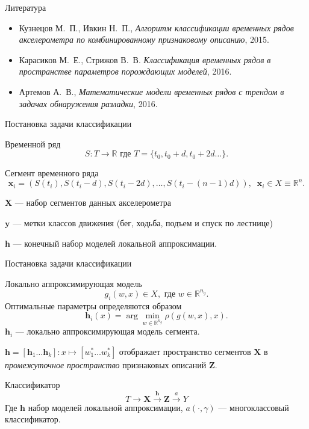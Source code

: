 \documentclass{beamer}
\newcommand{\bx}{\mathbf{x}}
\newcommand{\by}{\mathbf{y}}
\newcommand{\bX}{\mathbf{X}}
\newcommand{\bh}{\mathbf{h}}
\newcommand{\bZ}{\mathbf{Z}}
\newcommand{\R}{\mathbb{R}}
\begin{document}
\begin{frame}{Литература}
\begin{itemize}
    \item Кузнецов М.~П., Ивкин Н.~П., \textit{Алгоритм классификации временных рядов акселерометра по комбинированному признаковому описанию}, 2015.
    \item Карасиков М.~Е., Стрижов В.~В. \textit{Классификация временных рядов в пространстве параметров порождающих моделей}, 2016.
    \item Артемов А.~В., \textit{Математические модели временных рядов с трендом в задачах обнаружения разладки}, 2016.
\end{itemize}
\end{frame}




\begin{frame}{Постановка задачи классификации}
    \begin{block}{Временной ряд}
    $$
    S: T \to \R \text{ где } T = \{t_0, t_0 + d, t_0 + 2d \ldots\}.
    $$
    \end{block}
    \begin{block}{Сегмент временного ряда}%
    $$
    \bx_i  = (S(t_i), S(t_i - d), S(t_i - 2d), \ldots, S(t_i - (n - 1)d)),
\;\; \bx_i \in X \equiv \R^n.
    $$
    \end{block}
        $\bX$ — набор сегментов данных акселерометра

        $\by$ — метки классов движения (бег, ходьба, подъем и спуск по лестнице)

        $\bh$ — конечный набор моделей локальной аппроксимации.

\end{frame}



\begin{frame}{Постановка задачи классификации}
    \begin{block}{Локально аппроксимирующая модель}
        $$
        g_i(w, x) \in X, \text{ где }w \in \R^{n_g}.
        $$
        Оптимальные параметры определяются образом
        $$
        \bh_i(x) = \arg\min_{w \in \R^{n_g}} \rho(g(w, x), x).
        $$
        $\bh_i$ — локально аппроксимирующая модель сегмента.
    \end{block}

    $\bh = [\bh_1\ldots \bh_k]: x \mapsto [w_1^* \ldots w_k^*]$
    отображает пространство сегментов $\bX$ в
    \textit{промежуточное пространство} признаковых описаний $\bZ$.
    \begin{block}{Классификатор}
        $$
        T \rightarrow \bX \xrightarrow{\bh} \bZ \xrightarrow{a} Y
        $$
        Где $\bh$ набор моделей локальной аппроксимации, $a(\cdot, \gamma)$ —
        многоклассовый классификатор.
    \end{block}
\end{frame}
\end{document}
